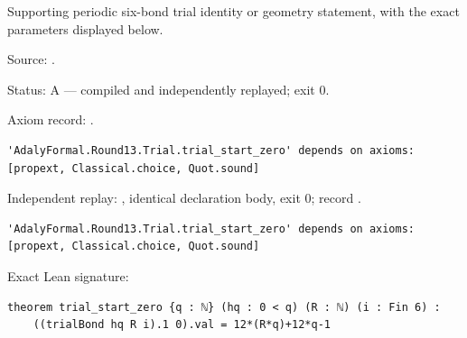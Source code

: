 \begin{theorem}[bp-363]
\label{bp-363}
\leanok
Supporting periodic six-bond trial identity or geometry statement, with the exact parameters displayed below.

\par Source: \texttt{}.
\par Status: A — compiled and independently replayed; exit 0.
\par Axiom record: \texttt{}.
\begin{verbatim}
'AdalyFormal.Round13.Trial.trial_start_zero' depends on axioms: [propext, Classical.choice, Quot.sound]
\end{verbatim}
\par Independent replay: \texttt{}, identical declaration body, exit 0; record \texttt{}.
\begin{verbatim}
'AdalyFormal.Round13.Trial.trial_start_zero' depends on axioms: [propext, Classical.choice, Quot.sound]
\end{verbatim}
\par Exact Lean signature:
\begin{verbatim}
theorem trial_start_zero {q : ℕ} (hq : 0 < q) (R : ℕ) (i : Fin 6) :
    ((trialBond hq R i).1 0).val = 12*(R*q)+12*q-1
\end{verbatim}
\end{theorem}

